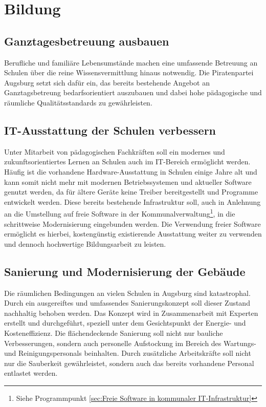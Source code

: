 \chapter{Bildung}
  
  \section{Ganztagesbetreuung ausbauen}
  
  Berufliche und familiäre Lebensumstände machen eine umfassende Betreuung an 
  Schulen über die reine Wissensvermittlung hinaus notwendig. Die 
  Piratenpartei Augsburg setzt sich dafür ein, das bereits bestehende Angebot 
  an Ganztagsbetreung bedarfsorientiert auszubauen und dabei hohe pädagogische 
  und räumliche Qualitätsstandards zu gewährleisten.
  
  \section{IT-Ausstattung der Schulen verbessern}
  
  Unter Mitarbeit von pädagogischen Fachkräften soll ein modernes und 
  zukunftsorientiertes Lernen an Schulen auch im IT-Bereich ermöglicht werden. 
  Häufig ist die vorhandene Hardware-Ausstattung in Schulen einige Jahre alt 
  und kann somit nicht mehr mit modernen Betriebssystemen und aktueller 
  Software genutzt werden, da für ältere Geräte keine Treiber bereitgestellt 
  und Programme entwickelt werden. Diese bereits bestehende Infrastruktur 
  soll, auch in Anlehnung an die Umstellung auf freie Software in der 
  Kommunalverwaltung\footnote{Siehe Programmpunkt \ref{sec:Freie Software in 
  kommunaler IT-Infrastruktur}}, in die schrittweise Modernisierung 
  eingebunden werden. Die Verwendung freier Software ermöglicht es hierbei, 
  kostengünstig existierende Ausstattung weiter zu verwenden und dennoch 
  hochwertige Bildungsarbeit zu leisten.
  
  \section{Sanierung und Modernisierung der Gebäude}
  
  Die räumlichen Bedingungen an vielen Schulen in Augsburg sind katastrophal. 
  Durch ein ausgereiftes und umfassendes Sanierungskonzept soll dieser Zustand 
  nachhaltig behoben werden. Das Konzept wird in Zusammenarbeit mit Experten 
  erstellt und durchgeführt, speziell unter dem Gesichtspunkt der Energie- und 
  Kosteneffizienz. Die flächendeckende Sanierung soll nicht nur bauliche 
  Verbesserungen, sondern auch personelle Aufstockung im Bereich des Wartungs- 
  und Reinigungspersonals beinhalten. Durch zusätzliche Arbeitskräfte soll 
  nicht nur die Sauberkeit gewährleistet, sondern auch das bereits vorhandene 
  Personal entlastet werden.
  
